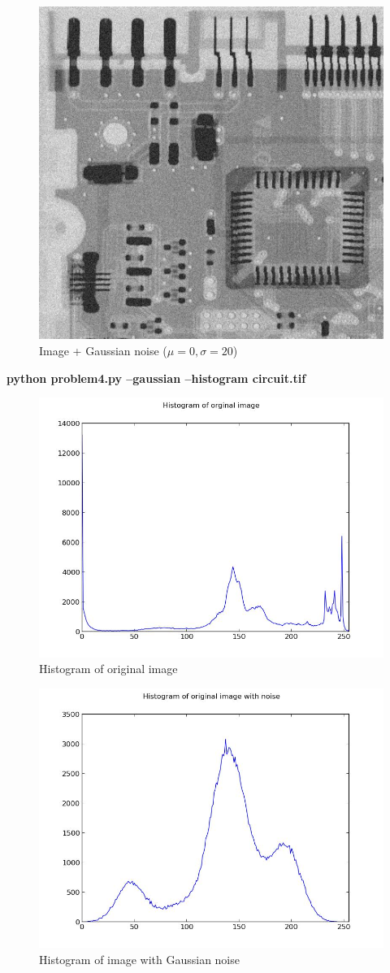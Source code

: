 \begin{figure}[!htb]\centering
    \includegraphics[width=0.6\linewidth]{./images/4/gaussian_noise.jpg}
    \caption{\small{Image + Gaussian noise ($\mu = 0, \sigma = 20$)}}\label{diagram:gaussian_noise}
\end{figure}


\pagebreak
\textbf{python problem4.py --gaussian --histogram circuit.tif}

\begin{figure}[!htb]\centering
    \includegraphics[width=0.7\linewidth]{./images/4/histogram_original.jpg}
    \caption{\small{Histogram of original image}}\label{diagram:histogram_original}
\end{figure}

\begin{figure}[!htb]\centering
    \includegraphics[width=0.7\linewidth]{./images/4/histogram_gaussian.jpg}
    \caption{\small{Histogram of image with Gaussian noise}}\label{diagram:histogram_gaussian}
\end{figure}


